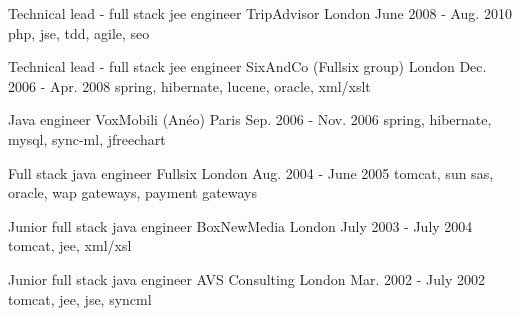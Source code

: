 \begin{cventries}

  \cventry
    {Technical lead - full stack jee engineer} %
    {\hspace{0.5em}TripAdvisor} %
    {London} %
    {June 2008 - Aug. 2010} %
    {php, jse, tdd, agile, seo} %
    {}

  \cventry
    {Technical lead - full stack jee engineer} %
    {\hspace{0.5em}SixAndCo (Fullsix group)} %
    {London} %
    {Dec. 2006 - Apr. 2008} %
    {spring, hibernate, lucene, oracle, xml/xslt} %
    {}

  \cventry
    {Java engineer} %
    {\hspace{0.5em}VoxMobili (Anéo)} %
    {Paris} %
    {Sep. 2006 - Nov. 2006} %
    {spring, hibernate, mysql, sync-ml, jfreechart} %
    {}

  \cventry
    {Full stack java engineer} %
    {\hspace{0.5em}Fullsix} %
    {London} %
    {Aug. 2004 - June 2005} %
    {tomcat, sun sas, oracle, wap gateways, payment gateways} %
    {}

  \cventry
    {Junior full stack java engineer} %
    {BoxNewMedia} %
    {London} %
    {July 2003 - July 2004} %
    {tomcat, jee, xml/xsl} %
    {}

  \cventry
    {Junior full stack java engineer} %
    {AVS Consulting} %
    {London} %
    {Mar. 2002 - July 2002} %
    {tomcat, jee, jse, syncml} %
    {}

\end{cventries}